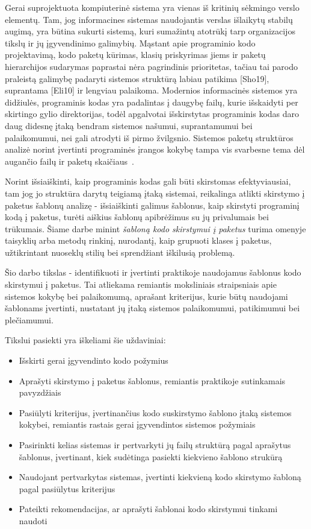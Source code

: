 Gerai suprojektuota kompiuterinė sistema yra vienas iš kritinių sėkmingo verslo
elementų.
Tam, jog informacines sistemas naudojantis verslas išlaikytų stabilų augimą, yra būtina sukurti sistemą, kuri sumažintų
atotrūkį tarp organizacijos tikslų ir jų įgyvendinimo galimybių.
Mąstant apie programinio kodo
projektavimą, kodo paketų kūrimas, klasių priskyrimas jiems ir paketų hierarchijos sudarymas paprastai
nėra pagrindinis prioritetas, tačiau tai parodo praleistą galimybę padaryti sistemos struktūrą labiau
patikima [Sho19], suprantama [Eli10] ir lengviau palaikoma.
Modernios informacinės sistemos yra didžiulės, programinis kodas yra padalintas į daugybę failų,
kurie išskaidyti per skirtingo gylio direktorijas, todėl apgalvotai išskirstytas programinis
kodas daro daug didesnę įtaką bendram sistemos našumui, suprantamumui bei palaikomumui, nei gali atrodyti iš pirmo žvilgsnio.
Sistemos paketų struktūros analizė norint įvertinti programinės įrangos kokybę
tampa vis svarbesne tema dėl augančio failų ir paketų skaičiaus~\cite{DesignMetrics}.

Norint išsiaiškinti, kaip programinis kodas gali būti skirstomas efektyviausiai,
tam jog jo struktūra darytų teigiamą įtaką sistemai, reikalinga atlikti skirstymo į paketus šablonų analizę -
išsiaiškinti galimus šablonus, kaip skirstyti programinį kodą į paketus, turėti aiškius šablonų apibrėžimus su jų
privalumais bei trūkumais.
Šiame darbe minint \textit{šabloną kodo skirstymui į paketus} turima omenyje taisyklių arba metodų rinkinį,
nurodantį, kaip grupuoti klases į paketus, užtikrintant nuoseklų stilių bei sprendžiant iškilusią problemą.

Šio darbo tikslas - identifikuoti ir įvertinti praktikoje naudojamus šablonus kodo skirstymui į paketus.
Tai atliekama remiantis moksliniais straipsniais apie sistemos kokybę bei palaikomumą, aprašant kriterijus,
kurie būtų naudojami šablonams įvertinti, nustatant jų įtaką sistemos palaikomumui, patikimumui bei plečiamumui.

Tikslui pasiekti yra iškeliami šie uždaviniai:
\begin{itemize}
    \item  Išskirti gerai įgyvendinto kodo požymius
    \item  Aprašyti skirstymo į paketus šablonus, remiantis praktikoje sutinkamais pavyzdžiais
    \item  Pasiūlyti kriterijus, įvertinančius kodo suskirstymo šablono įtaką sistemos kokybei, remiantis
rastais gerai įgyvendintos sistemos požymiais
    \item  Pasirinkti kelias sistemas ir pertvarkyti jų failų struktūrą pagal aprašytus šablonus, įvertinant,
kiek sudėtinga pasiekti kiekvieno šablono strukūrą
    \item  Naudojant pertvarkytas sistemas, įvertinti kiekvieną kodo skirstymo šabloną pagal pasiūlytus kriterijus
    \item  Pateikti rekomendacijas, ar aprašyti šablonai kodo skirstymui tinkami naudoti
\end{itemize}

